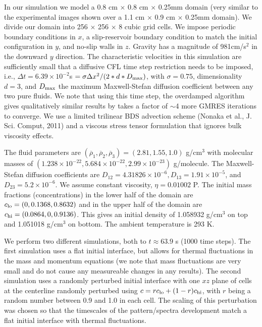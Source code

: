 \documentclass[final]{siamltex}
\begin{document}
In our simulation we model a 0.8 cm $\times$ 0.8 cm $\times$ 0.25mm domain (very similar to the experimental
images shown over a 1.1 cm $\times$ 0.9 cm $\times$ 0.25mm domain).  We divide our domain into 
256 $\times$ 256 $\times$ 8 cubic grid cells.  We impose periodic boundary conditions in $x$,
a slip-reservoir boundary condition to match the initial configuration in $y$, and no-slip walls in $z$.
Gravity has a magnitude of 981cm/s$^2$ in the downward $y$ direction.  The characteristic velocities in
this simulation are sufficiently small that a diffusive CFL time step restriction needs to be imposed, i.e.,
$\Delta t = 6.39 \times 10^{-2}$s $= \sigma\Delta x^2/(2*d*D_{\rm max})$, with $\sigma=0.75$, 
dimensionality $d=3$, and $D_{\rm max}$ the maximum Maxwell-Stefan diffusion coefficient between any two pure
fluids.  We note that using this time step, the overdamped algorithm gives qualitatively
similar results by takes a factor of $\sim$4 more GMRES iterations to converge.  We use a limited trilinear
BDS advection scheme (Nonaka et al., J. Sci. Comput, 2011) and a viscous stress tensor formulation that 
ignores bulk viscosity effects.

The fluid parameters are $(\overline\rho_1, \overline\rho_2, \overline\rho_3) = (2.81, 1.55, 1.0)$ g/cm$^3$
with molecular masses of $(1.238\times 10^{-22}, 5.684\times 10^{-22}, 2.99\times 10^{-23})$ g/molecule.
The Maxwell-Stefan diffusion coefficients are
$D_{12} = 4.31826\times 10^{-6}, D_{13} = 1.91\times 10^{-5}$, and $D_{23} = 5.2\times 10^{-6}$.
We assume constant viscosity, $\eta = 0.01002$ P.  The initial mass fractions (concentrations) in the 
lower half of the domain are $c_{\rm lo} = (0, 0.1368, 0.8632)$ and in the upper half of the domain
are $c_{\rm hi} = (0.0864, 0, 0.9136)$.  This gives an initial density of 1.058932 g/cm$^3$ on top 
and 1.051018 g/cm$^3$ on bottom.  The ambient temperature is 293 K.

We perform two different simulations, both to $t\approx 63.9$ s (1000 time steps).
The first simulation uses a flat initial interface, but allows for thermal fluctuations in the mass
and momentum equations (we note that mass fluctuations are very small and do not cause any measureable
changes in any results).  The second simulation uses a randomly perturbed initial interface with one $xz$ plane 
of cells at the centerline randomly perturbed using $c = r c_{\rm lo} + (1-r) c_{\rm hi}$, with $r$ being a 
random number between 0.9 and 1.0 in each cell.  The scaling of this perturbation was chosen
so that the timescales of the pattern/spectra development match a flat initial interface with thermal fluctuations.
\end{document}
